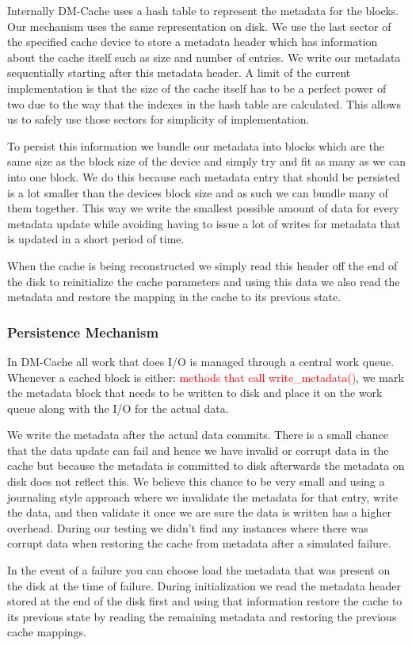 Internally DM-Cache uses a hash table to represent the metadata for
the blocks. Our mechanism uses the same representation on disk. We use
the last sector of the specified cache device to store a metadata
header which has information about the cache itself such as size and
number of entries. We write our metadata sequentially starting after
this metadata header. A limit of the current implementation is that
the size of the cache itself has to be a perfect power of two due to
the way that the indexes in the hash table are calculated. This allows
us to safely use those sectors for simplicity of implementation.

To persist this information we bundle our metadata into blocks which
are the same size as the block size of the device and simply try and
fit as many as we can into one block. We do this because each metadata
entry that should be persisted is a lot smaller than the devices block
size and as such we can bundle many of them together. This way we
write the smallest possible amount of data for every metadata update
while avoiding having to issue a lot of writes for metadata that is
updated in a short period of time.

When the cache is being reconstructed we simply read this header off
the end of the disk to reinitialize the cache parameters and using
this data we also read the metadata and restore the mapping in the
cache to its previous state.

\subsubsection{Persistence Mechanism}

In DM-Cache all work that does I/O is managed through a central work
queue. Whenever a cached block is either: \textcolor{red}{methods that
  call write\_metadata()}, we mark the metadata block that needs to be
written to disk and place it on the work queue along with the I/O for
the actual data.

We write the metadata after the actual data commits. There is a small
chance that the data update can fail and hence we have invalid or
corrupt data in the cache but because the metadata is committed to
disk afterwards the metadata on disk does not reflect this. We believe
this chance to be very small and using a journaling style approach
where we invalidate the metadata for that entry, write the data, and
then validate it once we are sure the data is written has a higher
overhead. During our testing we didn't find any instances where there
was corrupt data when restoring the cache from metadata after a
simulated failure.

In the event of a failure you can choose load the metadata that was
present on the disk at the time of failure. During initialization we
read the metadata header stored at the end of the disk first and using
that information restore the cache to its previous state by reading
the remaining metadata and restoring the previous cache mappings.
